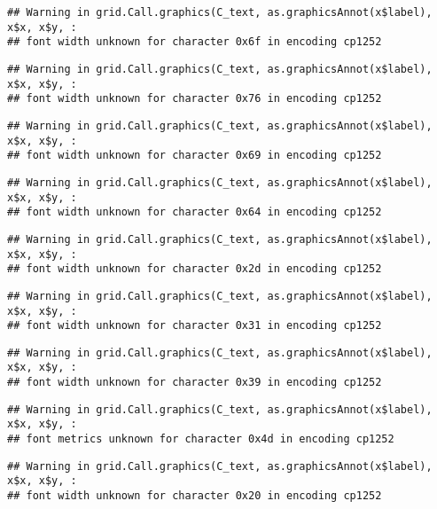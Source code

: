 \documentclass[
]{article}
\begin{document}
\begin{verbatim}
## Warning in grid.Call.graphics(C_text, as.graphicsAnnot(x$label), x$x, x$y, :
## font width unknown for character 0x6f in encoding cp1252
\end{verbatim}

\begin{verbatim}
## Warning in grid.Call.graphics(C_text, as.graphicsAnnot(x$label), x$x, x$y, :
## font width unknown for character 0x76 in encoding cp1252
\end{verbatim}

\begin{verbatim}
## Warning in grid.Call.graphics(C_text, as.graphicsAnnot(x$label), x$x, x$y, :
## font width unknown for character 0x69 in encoding cp1252
\end{verbatim}

\begin{verbatim}
## Warning in grid.Call.graphics(C_text, as.graphicsAnnot(x$label), x$x, x$y, :
## font width unknown for character 0x64 in encoding cp1252
\end{verbatim}

\begin{verbatim}
## Warning in grid.Call.graphics(C_text, as.graphicsAnnot(x$label), x$x, x$y, :
## font width unknown for character 0x2d in encoding cp1252
\end{verbatim}

\begin{verbatim}
## Warning in grid.Call.graphics(C_text, as.graphicsAnnot(x$label), x$x, x$y, :
## font width unknown for character 0x31 in encoding cp1252
\end{verbatim}

\begin{verbatim}
## Warning in grid.Call.graphics(C_text, as.graphicsAnnot(x$label), x$x, x$y, :
## font width unknown for character 0x39 in encoding cp1252
\end{verbatim}

\begin{verbatim}
## Warning in grid.Call.graphics(C_text, as.graphicsAnnot(x$label), x$x, x$y, :
## font metrics unknown for character 0x4d in encoding cp1252
\end{verbatim}

\begin{verbatim}
## Warning in grid.Call.graphics(C_text, as.graphicsAnnot(x$label), x$x, x$y, :
## font width unknown for character 0x20 in encoding cp1252
\end{verbatim}
\end{document}
